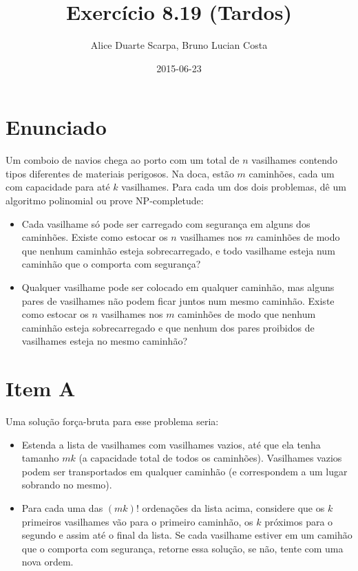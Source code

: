 \documentclass[11pt]{article}
\author{Alice Duarte Scarpa, Bruno Lucian Costa}
\date{2015-06-23}
\title{Exercício 8.19 (Tardos)}
\begin{document}
\maketitle

\section{Enunciado}
\label{sec-1}

Um comboio de navios chega ao porto com um total de $n$ vasilhames
contendo tipos diferentes de materiais perigosos.
Na doca, estão $m$ caminhões, cada um com capacidade para até $k$
vasilhames.  Para cada um dos dois problemas, dê um algoritmo
polinomial ou prove NP-completude:


\begin{itemize}
\item Cada vasilhame só pode ser carregado com segurança em alguns
dos caminhões. Existe como estocar os $n$ vasilhames nos $m$
caminhões de modo que nenhum caminhão esteja sobrecarregado, e
todo vasilhame esteja num caminhão que o comporta com segurança?

\item Qualquer vasilhame pode ser colocado em qualquer caminhão,
mas alguns pares de vasilhames não podem ficar juntos num mesmo
caminhão. Existe como estocar os $n$ vasilhames nos $m$
caminhões de modo que nenhum caminhão esteja sobrecarregado e
que nenhum dos pares proibidos de vasilhames esteja no mesmo
caminhão?
\end{itemize}

\section{Item A}
\label{sec-2}

Uma solução força-bruta para esse problema seria:

\begin{itemize}
\item Estenda a lista de vasilhames com vasilhames vazios, até que ela
tenha tamanho $mk$ (a capacidade total de todos os
caminhões). Vasilhames vazios podem ser transportados em qualquer
caminhão (e correspondem a um lugar sobrando no mesmo).
\item Para cada uma das $(mk)!$ ordenações da lista acima, considere que
os $k$ primeiros vasilhames vão para o primeiro caminhão, os $k$
próximos para o segundo e assim até o final da lista. Se cada
vasilhame estiver em um camihão que o comporta com segurança,
retorne essa solução, se não, tente com uma nova ordem.
\end{itemize}
\end{document}
